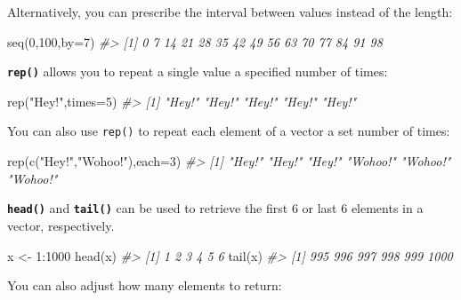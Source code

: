 \documentclass[
]{book}
\newenvironment{Shaded}{\begin{snugshade}}{\end{snugshade}}
\newcommand{\AttributeTok}[1]{\textcolor[rgb]{0.77,0.63,0.00}{#1}}
\newcommand{\CommentTok}[1]{\textcolor[rgb]{0.56,0.35,0.01}{\textit{#1}}}
\newcommand{\DecValTok}[1]{\textcolor[rgb]{0.00,0.00,0.81}{#1}}
\newcommand{\FunctionTok}[1]{\textcolor[rgb]{0.00,0.00,0.00}{#1}}
\newcommand{\NormalTok}[1]{#1}
\newcommand{\OtherTok}[1]{\textcolor[rgb]{0.56,0.35,0.01}{#1}}
\newcommand{\SpecialCharTok}[1]{\textcolor[rgb]{0.00,0.00,0.00}{#1}}
\newcommand{\StringTok}[1]{\textcolor[rgb]{0.31,0.60,0.02}{#1}}
\begin{document}
Alternatively, you can prescribe the interval between values instead of the length:

\begin{Shaded}
\begin{Highlighting}[]
\FunctionTok{seq}\NormalTok{(}\DecValTok{0}\NormalTok{,}\DecValTok{100}\NormalTok{,}\AttributeTok{by=}\DecValTok{7}\NormalTok{)}
\CommentTok{\#\textgreater{}  [1]  0  7 14 21 28 35 42 49 56 63 70 77 84 91 98}
\end{Highlighting}
\end{Shaded}

\textbf{\texttt{rep()}} allows you to repeat a single value a specified number of times:

\begin{Shaded}
\begin{Highlighting}[]
\FunctionTok{rep}\NormalTok{(}\StringTok{"Hey!"}\NormalTok{,}\AttributeTok{times=}\DecValTok{5}\NormalTok{)}
\CommentTok{\#\textgreater{} [1] "Hey!" "Hey!" "Hey!" "Hey!" "Hey!"}
\end{Highlighting}
\end{Shaded}

You can also use \texttt{rep()} to repeat each element of a vector a set number of times:

\begin{Shaded}
\begin{Highlighting}[]
\FunctionTok{rep}\NormalTok{(}\FunctionTok{c}\NormalTok{(}\StringTok{"Hey!"}\NormalTok{,}\StringTok{"Wohoo!"}\NormalTok{),}\AttributeTok{each=}\DecValTok{3}\NormalTok{)}
\CommentTok{\#\textgreater{} [1] "Hey!"   "Hey!"   "Hey!"   "Wohoo!" "Wohoo!" "Wohoo!"}
\end{Highlighting}
\end{Shaded}

\textbf{\texttt{head()}} and \textbf{\texttt{tail()}} can be used to retrieve the first 6 or last 6 elements in a vector, respectively.

\begin{Shaded}
\begin{Highlighting}[]
\NormalTok{x }\OtherTok{\textless{}{-}} \DecValTok{1}\SpecialCharTok{:}\DecValTok{1000}
\FunctionTok{head}\NormalTok{(x)}
\CommentTok{\#\textgreater{} [1] 1 2 3 4 5 6}
\FunctionTok{tail}\NormalTok{(x)}
\CommentTok{\#\textgreater{} [1]  995  996  997  998  999 1000}
\end{Highlighting}
\end{Shaded}

You can also adjust how many elements to return:
\end{document}
